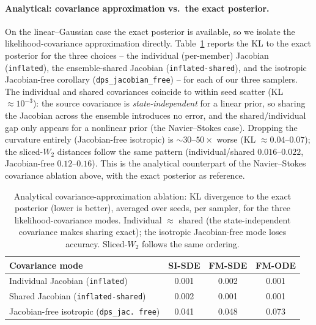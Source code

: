 \paragraph{Analytical: covariance approximation vs.\ the exact posterior.}
On the linear--Gaussian case the exact posterior is available, so we isolate the
likelihood-covariance approximation directly. Table~\ref{tab:analytical_ablation} reports the KL to
the exact posterior for the three choices -- the individual (per-member) Jacobian
(\texttt{inflated}), the ensemble-shared Jacobian (\texttt{inflated-shared}), and the isotropic
Jacobian-free corollary (\texttt{dps\_jacobian\_free}) -- for each of our three samplers. The
individual and shared covariances coincide to within seed scatter (KL $\approx 10^{-3}$): the source
covariance is \emph{state-independent} for a linear prior, so sharing the Jacobian across the
ensemble introduces no error, and the shared/individual gap only appears for a nonlinear prior (the
Navier--Stokes case). Dropping the curvature entirely (Jacobian-free isotropic) is
$\sim\!30$--$50\times$ worse (KL $\approx 0.04$--$0.07$); the sliced-$W_2$ distances follow the same
pattern (individual/shared $0.016$--$0.022$, Jacobian-free $0.12$--$0.16$). This is the analytical
counterpart of the Navier--Stokes covariance ablation above, with the exact posterior as reference.

\begin{table}[ht]
    \centering
    \small
    \caption{Analytical covariance-approximation ablation: KL divergence to the exact posterior (lower is better), averaged over seeds, per sampler, for the three likelihood-covariance modes. Individual $\approx$ shared (the state-independent covariance makes sharing exact); the isotropic Jacobian-free mode loses accuracy. Sliced-$W_2$ follows the same ordering.}
    \label{tab:analytical_ablation}
    \begin{tabular}{l|ccc}
        \toprule
        Covariance mode & SI-SDE & FM-SDE & FM-ODE \\
        \midrule
        Individual Jacobian (\texttt{inflated})        & 0.001 & 0.002 & 0.001 \\
        Shared Jacobian (\texttt{inflated-shared})     & 0.002 & 0.001 & 0.001 \\
        Jacobian-free isotropic (\texttt{dps\_jac.\,free}) & 0.041 & 0.048 & 0.073 \\
        \bottomrule
    \end{tabular}
\end{table}

